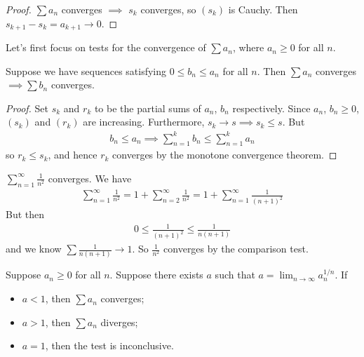 \documentclass{../../template/note}
\begin{document}
    \begin{proof}
        \(\sum a_n\) converges \(\implies\) \(s_k\) converges, so \((s_k)\) is Cauchy. Then \(s_{k+1} - s_k = a_{k+1} \to 0\).
    \end{proof}
    
    Let's first focus on tests for the convergence of \(\sum a_n\), where \(a_n \geq 0\) for all \(n\).

    \begin{proposition}
        Suppose we have sequences satisfying \(0 \leq b_n \leq a_n\) for all \(n\). Then \(\sum a_n\) converges \(\implies \sum b_n\) converges.
    \end{proposition}
    
    \begin{proof}
        Set \(s_k\) and \(r_k\) to be the partial sums of \(a_n\), \(b_n\) respectively. Since \(a_n\), \(b_n \geq 0\), \((s_k)\) and \((r_k)\) are increasing. Furthermore, \(s_k \to s \implies s_k \leq s\). But      
        \begin{align*}
            b_n \leq a_n \implies \sum_{n=1}^k b_n \leq \sum_{n=1}^k a_n
        \end{align*}
        so \(r_k \leq s_k\), and hence \(r_k\) converges by the monotone convergence theorem.
    \end{proof}
    
    \begin{example}
        \(\sum_{n=1}^\infty \frac 1 {n^2}\) converges. We have
        \begin{align*}
            \sum_{n=1}^\infty \frac 1 {n^2} = 1 + \sum_{n=2}^\infty \frac 1 {n^2} = 1 + \sum_{n=1}^\infty \frac 1 {(n+1)^2}
        \end{align*}
        But then
        \begin{align*}
            0 \leq \frac 1 {(n+1)^2} \leq \frac 1 {n(n+1)}
        \end{align*}
        and we know \(\sum \frac 1 {n(n+1)} \to 1\). So \(\frac 1 {n^2}\) converges by the comparison test.
    \end{example}
    
    \begin{proposition}
        Suppose \(a_n \geq 0\) for all \(n\). Suppose there exists \(a\) such that \(a = \lim_{n \to \infty} a_n^{1/n}\). If
        \begin{itemize}
            \item \(a < 1\), then \(\sum a_n\) converges;
            \item \(a > 1\), then \(\sum a_n\) diverges;
            \item \(a = 1\), then the test is inconclusive.
        \end{itemize}
    \end{proposition}
    
\end{document}

